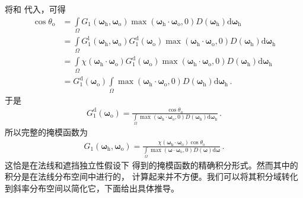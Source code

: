 将和
代入，可得
\begin{align}
    \cos\theta_{\mathrm{o}}
     & =\int\limits_{\varOmega}G_1({\bm\omega}_{\mathrm{h}},{\bm\omega}_{\mathrm{o}})
    \max({\bm\omega}_{\mathrm{h}}\cdot{\bm\omega}_{\mathrm{o}},0)
    D({\bm\omega}_{\mathrm{h}})\mathrm{d}{\bm\omega}_{\mathrm{h}}\nonumber                         \\
     & =\int\limits_{\varOmega}G_1^{\mathrm{l}}({\bm\omega}_{\mathrm{h}},{\bm\omega}_{\mathrm{o}})
    G_1^{\mathrm{d}}({\bm\omega}_{\mathrm{o}})
    \max({\bm\omega}_{\mathrm{h}}\cdot{\bm\omega}_{\mathrm{o}},0)
    D({\bm\omega}_{\mathrm{h}})\mathrm{d}{\bm\omega}_{\mathrm{h}}\nonumber                         \\
     & =\int\limits_{\varOmega}\chi({\bm\omega}_{\mathrm{h}}\cdot{\bm\omega}_{\mathrm{o}})
    G_1^{\mathrm{d}}({\bm\omega}_{\mathrm{o}})
    \max({\bm\omega}_{\mathrm{h}}\cdot{\bm\omega}_{\mathrm{o}},0)
    D({\bm\omega}_{\mathrm{h}})\mathrm{d}{\bm\omega}_{\mathrm{h}}\nonumber                         \\
     & =G_1^{\mathrm{d}}({\bm\omega}_{\mathrm{o}})\int\limits_{\varOmega}
    \max({\bm\omega}_{\mathrm{h}}\cdot{\bm\omega}_{\mathrm{o}},0)
    D({\bm\omega}_{\mathrm{h}})\mathrm{d}{\bm\omega}_{\mathrm{h}}\, .
\end{align}
于是
\begin{align}\label{eq:08-ex01-g1_distance}
    G_1^{\mathrm{d}}({\bm\omega}_{\mathrm{o}})
    =\frac{\cos\theta_{\mathrm{o}}}
    {\displaystyle\int\limits_{\varOmega}\max({\bm\omega}_{\mathrm{h}}\cdot{\bm\omega}_{\mathrm{o}},0)
    D({\bm\omega}_{\mathrm{h}})\mathrm{d}{\bm\omega}_{\mathrm{h}}}\, .
\end{align}
所以完整的掩模函数为
\begin{align}\label{eq:08-ex01-masking-g1-int}
    G_1({\bm\omega}_{\mathrm{h}},{\bm\omega}_{\mathrm{o}})
    =\frac{\chi({\bm\omega}_{\mathrm{h}}\cdot{\bm\omega}_{\mathrm{o}})\cos\theta_{\mathrm{o}}}
    {\displaystyle\int\limits_{\varOmega}\max({\bm\omega}\cdot{\bm\omega}_{\mathrm{o}},0)
        D({\bm\omega})\mathrm{d}{\bm\omega}}\, .
\end{align}
这恰是\citet{10.1145/344779.344814}在法线和遮挡独立性假设下
得到的掩模函数的精确积分形式。然而其中的积分是在法线分布空间中进行的，
计算起来并不方便。我们可以将其积分域转化到斜率分布空间以简化它，下面给出具体推导。


